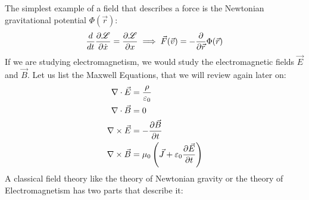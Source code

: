 \documentclass{article}
\begin{document}
 		The simplest example of a field that describes a force is the Newtonian gravitational potential $\Phi (\vec{r})$:
 		\begin{equation}
 			\label{eq:NetwonGravitation}
 			\frac{d}{dt}\frac{\partial \mathscr{L}}{\partial \dot{x}} = \frac{\partial \mathscr{L}}{\partial x} \implies \vec{F} (\vec{v}) = - \frac{\partial}{\partial \vec{r}} \Phi (\vec{r}) 
 		\end{equation}
 		\noindent
 		If we are studying electromagnetism, we would study the electromagnetic fields $\vec{E}$ and $\vec{B}$. Let us list the Maxwell Equations, that we will review again later on:
 			\begin{align}
 				\label{eq:Maxwell}
 				\nabla \cdot \vec{E} &= \frac{\rho}{\varepsilon_0} \\
 				\nabla \cdot \vec{B} &= 0 \\
 				\nabla \times \vec{E} &= -\frac{\partial \vec{B}}{\partial t} \\
 				\nabla \times \vec{B} &= \mu_0 \left( \vec{J} + \varepsilon_0 \frac{\partial \vec{E}}{\partial t} \right)
 			\end{align}
 		A classical field theory like the theory of Newtonian gravity or the theory of Electromagnetism has two parts that describe it:
\end{document}
